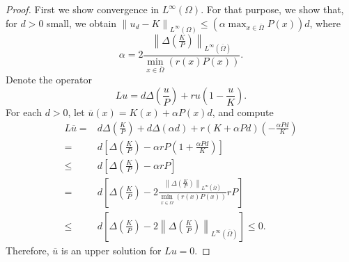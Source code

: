 \documentclass[11pt]{article}
\newcommand{\norm}[1]{\left\|#1\right\|}
\newcommand{\parentheses}[1]{\left(#1\right)}
\newcommand{\brackets}[1]{\left[#1\right]}
\theoremstyle{definition}
\theoremstyle{remark}
\begin{document}
\begin{proof}

    First we show convergence in $L^\infty(\Omega)$. For that purpose, we show that, for $d>0$ small, we obtain $\norm{u_d-K}_{L^\infty(\Omega)}\leq \parentheses{\alpha \max_{x\in\overline{\Omega}}P(x)}d$, where
    \begin{equation*}
        \alpha =2\frac{\norm{\Delta(\frac{K}{P})}_{L^\infty(\overline{\Omega})}}{\min_{x\in\overline{\Omega}}(r(x)P(x))}.
    \end{equation*}
    Denote the operator
    \begin{equation*}
        Lu=d\Delta\parentheses{\frac{u}{P}}+ru\parentheses{1-\frac{u}{K}}.
    \end{equation*}
    For each $d>0$, let $\overline{u}(x)=K(x)+\alpha P(x)d$, and compute
    \begin{align*}
        L\overline{u}=&d\Delta\parentheses{\frac{K}{P}}+d\Delta(\alpha d)+r(K+\alpha Pd)\parentheses{-\frac{\alpha Pd}{K}}
\\  = &d\brackets{\Delta\parentheses{\frac{K}{P}}-\alpha rP\parentheses{1+\frac{\alpha Pd}{K}}}
\\
        \leq  & d\brackets{\Delta\parentheses{\frac{K}{P}}-\alpha rP}\\
        =&d\brackets{\Delta\parentheses{\frac{K}{P}}-2\frac{\norm{\Delta(\frac{K}{P})}_{L^\infty(\overline{\Omega})}}{\min_{x\in\overline{\Omega}}(r(x)P(x))}rP}
\\  \leq &  d\brackets{\Delta\parentheses{\frac{K}{P}}-2\norm{\Delta\parentheses{\frac{K}{P}}}_{L^\infty(\overline{\Omega})}}\leq0.
    \end{align*}
    Therefore, $\overline{u}$ is an upper solution for $Lu=0$.


\end{proof}
\end{document}
